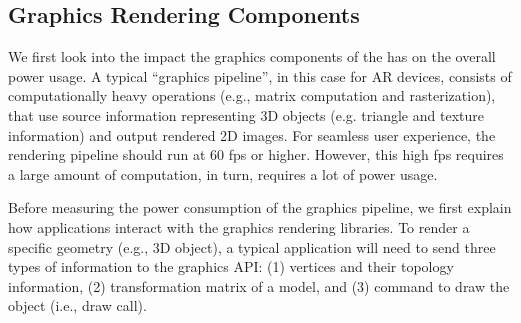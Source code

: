 \subsection{Graphics Rendering Components}


We first look into the impact the graphics components of the {\mlo} has on the overall power usage. A typical ``graphics pipeline'',
in this case for AR devices, consists of computationally heavy operations (e.g., matrix computation and rasterization), that use source information representing 3D objects (e.g. triangle and texture information) and output rendered 2D images. For seamless user experience, the rendering pipeline should run at 60 fps or higher. However, this high fps requires a large amount of computation, in turn, requires a lot of power usage.

Before measuring the power consumption of the graphics pipeline, we first explain how applications interact with the graphics rendering libraries. To render a specific geometry (e.g., 3D object), a typical application will need to send three types of information to the graphics API:  (1) vertices and their topology information, (2) transformation matrix of a model, and (3) command to draw the object (i.e., draw call).







